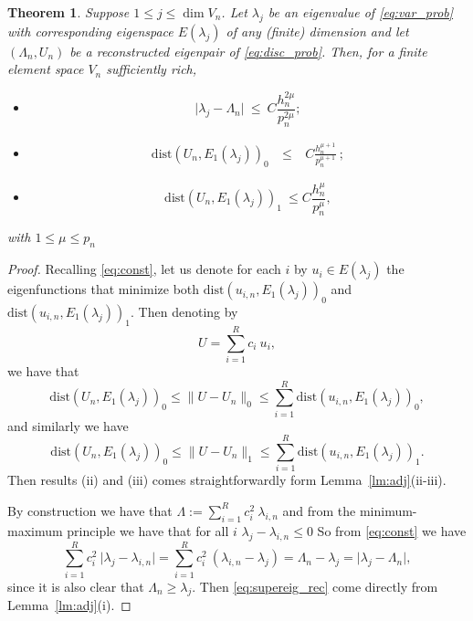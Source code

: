 \documentclass[preprint,12pt]{elsarticle}
\newtheorem{theorem}{Theorem}[section]
\begin{document}
\begin{theorem}
\label{th:adj_rec}
Suppose  $ 1 \leq j\leq \dim V_n$. Let
$\lambda_j$ be an eigenvalue   of \eqref{eq:var_prob} with
corresponding eigenspace $E(\lambda_j)$ of any (finite) dimension  and
let $(\Lambda_n,U_n)$ be a reconstructed eigenpair  of \eqref{eq:disc_prob}.
Then, for a finite element space $V_n$ sufficiently rich,
\begin{itemize}
\item[(i)] 
\begin{equation}
\vert \lambda_j - \Lambda_n \vert \ \leq \ C
\frac{h_n^{2\mu} }{p_n^{2\mu}} ;  \label{eq:supereig_rec}
\end{equation}
\item[(ii)] 
\begin{eqnarray}
\mathrm{dist}(
U_n,E_1(\lambda_j))_{0}\ & \leq& \ C \frac{h_n^{\mu+1} }{p_n^{\mu+1}} \ ; \label{eq:adj_rec}
\end{eqnarray}
\item[(iii)]
\begin{equation}
\label{eq:energy_rec} \mathrm{dist}(
U_n,E_1(\lambda_j))_{1} \ \leq
C \frac{h_n^{\mu}}{p_n^{\mu}},
\end{equation}
\end{itemize}
with $1\leq \mu\leq p_n$
\end{theorem}

\begin{proof}
Recalling \eqref{eq:const}, let us denote for each $i$ by $u_i\in E(\lambda_j)$ the eigenfunctions that minimize both $\mathrm{dist}(
u_{i,n},E_1(\lambda_j))_{0}$ and $\mathrm{dist}(
u_{i,n},E_1(\lambda_j))_{1}$. Then denoting by 
$$
U=\sum_{i=1}^{R} c_i \ u_{i},
$$
we have that
$$
\mathrm{dist}(
U_n,E_1(\lambda_j))_{0}\leq \|U-U_n\|_{0}\leq \sum_{i=1}^{R} \mathrm{dist}(
u_{i,n},E_1(\lambda_j))_{0},
$$
and similarly we have
$$
\mathrm{dist}(
U_n,E_1(\lambda_j))_{0}\leq \|U-U_n\|_{1}\leq \sum_{i=1}^{R} \mathrm{dist}(
u_{i,n},E_1(\lambda_j))_{1}.
$$
Then results (ii) and (iii) comes straightforwardly form Lemma~\ref{lm:adj}(ii-iii).


By construction we have that $\Lambda:=\sum_{i=1}^{R} c_i^2 \ \lambda_{i,n}$ and from the minimum-maximum principle we have that for all $i$ $\lambda_j - \lambda_{i,n}\leq 0$
So from 
\eqref{eq:const} we have
$$
\sum_{i=1}^{R} c_i^2 \ \vert \lambda_j - \lambda_{i,n} \vert=
 \sum_{i=1}^{R} c_i^2 \ (\lambda_{i,n} - \lambda_j )=  \Lambda_n - \lambda_j
 = \vert \lambda_j - \Lambda_n \vert,
$$
since it is also clear that $\Lambda_n\ge \lambda_j$. Then \eqref{eq:supereig_rec} come directly from 
Lemma~\ref{lm:adj}(i).


\end{proof}
\end{document}
